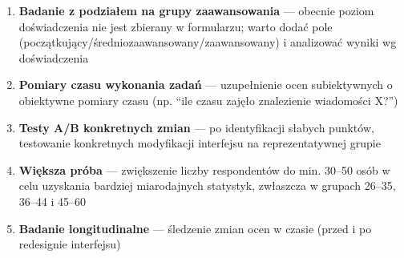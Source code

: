 \documentclass[12pt,a4paper]{article}
\begin{document}
\begin{enumerate}
    \item \textbf{Badanie z podziałem na grupy zaawansowania} --- obecnie poziom doświadczenia nie jest zbierany w formularzu; warto dodać pole (początkujący/średniozaawansowany/zaawansowany) i analizować wyniki wg doświadczenia

    \item \textbf{Pomiary czasu wykonania zadań} --- uzupełnienie ocen subiektywnych o obiektywne pomiary czasu (np. ``ile czasu zajęło znalezienie wiadomości X?'')

    \item \textbf{Testy A/B konkretnych zmian} --- po identyfikacji słabych punktów, testowanie konkretnych modyfikacji interfejsu na reprezentatywnej grupie

    \item \textbf{Większa próba} --- zwiększenie liczby respondentów do min. 30--50 osób w celu uzyskania bardziej miarodajnych statystyk, zwłaszcza w grupach 26--35, 36--44 i 45--60

    \item \textbf{Badanie longitudinalne} --- śledzenie zmian ocen w czasie (przed i po redesignie interfejsu)
\end{enumerate}
\end{document}
